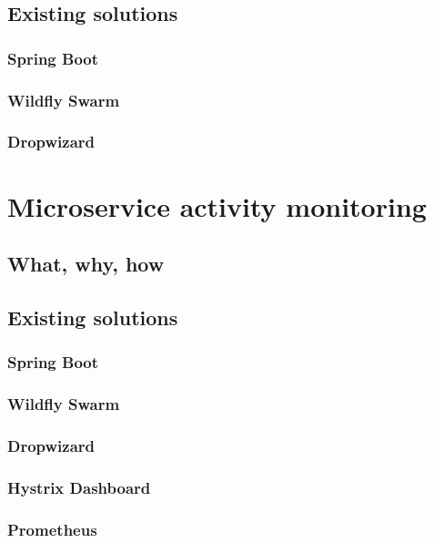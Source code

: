 \documentclass[12pt,oneside]{fithesis2}
\begin{document}
\section{Existing solutions}

\subsection{Spring Boot}

\subsection{Wildfly Swarm}

\subsection{Dropwizard}




\chapter{Microservice activity monitoring}

\section{What, why, how}

\section{Existing solutions}

\subsection{Spring Boot}

\subsection{Wildfly Swarm}

\subsection{Dropwizard}

\subsection{Hystrix Dashboard}

\subsection{Prometheus}
\end{document}
